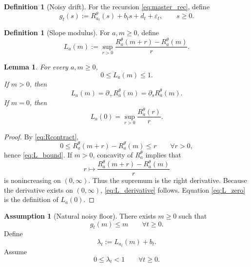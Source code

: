\documentclass{article}
\newtheorem{lemma}[theorem]{Lemma}
\theoremstyle{definition}
\newtheorem{definition}[theorem]{Definition}
\newtheorem{assumption}[theorem]{Assumption}
\begin{document}
\begin{definition}[Noisy drift]
\label{def:noisy_drift}
For the recursion \eqref{eq:master_rec}, define
\begin{equation*}
g_t(s):=R_{a_t}^\theta(s)+b_t s+d_t+\varepsilon_t,
\qquad s\ge 0.
\end{equation*}
\end{definition}

\begin{definition}[Slope modulus]
\label{def:slope_modulus}
For $a,m\ge 0$, define
\begin{equation}
L_a(m):=
\sup_{r>0}
\frac{R_a^\theta(m+r)-R_a^\theta(m)}{r}.
\label{eq:L}
\end{equation}
\end{definition}

\begin{lemma}
\label{lem:L}
For every $a,m\ge 0$,
\begin{equation}
0\le L_a(m)\le 1.
\label{eq:L_bound}
\end{equation}
If $m>0$, then
\begin{equation}
L_a(m)=\partial_+R_a^\theta(m)=\partial_sR_a^\theta(m).
\label{eq:L_derivative}
\end{equation}
If $m=0$, then
\begin{equation}
L_a(0)=\sup_{r>0}\frac{R_a^\theta(r)}{r}.
\label{eq:L_zero}
\end{equation}
\end{lemma}

\begin{proof}
By \eqref{eq:Rcontract},
\[
0\le R_a^\theta(m+r)-R_a^\theta(m)\le r
\qquad
\forall r>0,
\]
hence \eqref{eq:L_bound}.
If $m>0$, concavity of $R_a^\theta$ implies that
\[
r\mapsto \frac{R_a^\theta(m+r)-R_a^\theta(m)}{r}
\]
is nonincreasing on $(0,\infty)$.
Thus the supremum is the right derivative.
Because the derivative exists on $(0,\infty)$, \eqref{eq:L_derivative} follows.
Equation \eqref{eq:L_zero} is the definition of $L_a(0)$.
\end{proof}

\begin{assumption}[Natural noisy floor]
\label{ass:noisy_floor}
There exists $m\ge 0$ such that
\begin{equation}
g_t(m)\le m
\qquad
\forall t\ge 0.
\label{eq:floor}
\end{equation}
Define
\begin{equation}
\lambda_t:=L_{a_t}(m)+b_t.
\label{eq:lambda}
\end{equation}
Assume
\begin{equation}
0\le \lambda_t<1
\qquad
\forall t\ge 0.
\label{eq:lambda_contract}
\end{equation}
\end{assumption}
\end{document}
